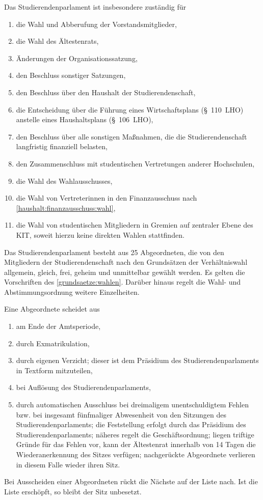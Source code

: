 \begin{jurdoc}
Das Studierendenparlament ist insbesondere zuständig für
\begin{enumerate}
\item die Wahl und Abberufung der Vorstandsmitglieder,
\item die Wahl des Ältestenrats,
\item Änderungen der Organisationssatzung,
\item den Beschluss sonstiger Satzungen,
\item den Beschluss über den Haushalt der Studierendenschaft,
\item die Entscheidung über die Führung eines Wirtschaftsplans (§~110~LHO) anstelle eines Haushaltsplans (§~106~LHO),
\item den Beschluss über alle sonstigen Maßnahmen, die die Studierendenschaft langfristig finanziell belasten,
\item den Zusammenschluss mit studentischen Vertretungen anderer Hochschulen,
\item die Wahl des Wahlausschusses,
\item die Wahl von Vertreterinnen in den Finanzausschuss nach \ref{haushalt:finanzausschuss:wahl},
\item die Wahl von studentischen Mitgliedern in Gremien auf zentraler Ebene des KIT, soweit hierzu keine direkten Wahlen stattfinden.
\end{enumerate}


\label{stupa:zusammensetzung}

Das Studierendenparlament besteht aus 25 Abgeordneten, die von den Mitgliedern der Studierendenschaft nach den Grundsätzen der Verhältniswahl allgemein, gleich, frei, geheim und unmittelbar gewählt werden. Es gelten die Vorschriften des \ref{grundsaetze:wahlen}. Darüber hinaus regelt die Wahl- und Abstimmungsordnung weitere Einzelheiten.

Eine Abgeordnete scheidet aus \label{stupa:zusammensetzung:ausscheiden}
  \begin{enumerate}
  \item am Ende der Amtsperiode,
  \item durch Exmatrikulation,
  \item durch eigenen Verzicht; dieser ist dem Präsidium des Studierendenparlaments in Textform mitzuteilen,
  \item bei Auflösung des Studierendenparlaments,
  \item durch automatischen Ausschluss bei dreimaligem unentschuldigtem Fehlen bzw. bei insgesamt fünfmaliger Abwesenheit von den Sitzungen des Studierendenparlaments; die Feststellung erfolgt durch das Präsidium des Studierendenparlaments; näheres regelt die Geschäftsordnung; liegen triftige Gründe für das Fehlen vor, kann der Ältestenrat innerhalb von 14 Tagen die Wiederanerkennung des Sitzes verfügen; nachgerückte Abgeordnete verlieren in diesem Falle wieder ihren Sitz. \label{stupa:zusammensetzung:ausscheiden:wiederanerkennung}
\end{enumerate}
Bei Ausscheiden einer Abgeordneten rückt die Nächste auf der Liste nach. Ist die Liste erschöpft, so bleibt der Sitz unbesetzt.


\end{jurdoc}
